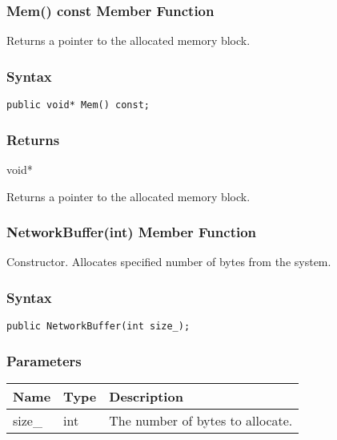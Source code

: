 \documentclass[a4paper,oneside,11.000000pt]{book}
\begin{document}
\hypertarget{System.Net.Sockets.NetworkBuffer.Mem.C.P.System.Net.Sockets.NetworkBuffer}{\subsubsection*{Mem() const Member Function}}
\begin{flushleft}
Returns a pointer to the allocated memory block.

\end{flushleft}
\subsubsection*{Syntax}\texttt{public void* Mem() const;}

\subsubsection*{Returns}void*
\begin{flushleft}
Returns a pointer to the allocated memory block.

\end{flushleft}
\clearpage

\hypertarget{System.Net.Sockets.NetworkBuffer.constructor.P.System.Net.Sockets.NetworkBuffer.int}{\subsubsection*{NetworkBuffer(int) Member Function}}
\begin{flushleft}
Constructor. Allocates specified number of bytes from the system.

\end{flushleft}
\subsubsection*{Syntax}\texttt{public NetworkBuffer(int size\_);}

\subsubsection*{Parameters}
\begin{flushleft}
\begin{supertabular}[l]{lll}
\textbf{Name}
& \textbf{Type}
& \textbf{Description}
\\
\hline
size\_
& int
& The number of bytes to allocate.

\\
\end{supertabular}

\end{flushleft}
\clearpage
\end{document}
